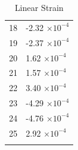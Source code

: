 \documentclass[a4paper,11pt]{article}
\begin{document}
\begin{center}
\begin{longtable}{|R{1.5cm}|R{2.5cm}|}
   18 &        -2.32 $\times 10^{          -4}$ \\
   19 &        -2.37 $\times 10^{          -4}$ \\
   20 &         1.62 $\times 10^{          -4}$ \\
   21 &         1.57 $\times 10^{          -4}$ \\
 {\color{OliveGreen}  22} & {\color{OliveGreen}        3.40 $\times 10^{          -4}$} \\
   23 &        -4.29 $\times 10^{          -4}$ \\
 {\color{red}  24} & {\color{red}       -4.76 $\times 10^{          -4}$} \\
   25 &         2.92 $\times 10^{          -4}$ \\
\bottomrule[0.8mm]                               
\caption{Linear Strain}             
\end{longtable}                                  
\end{center}                                     

\newpage  
\listoftables  
\end{document}
